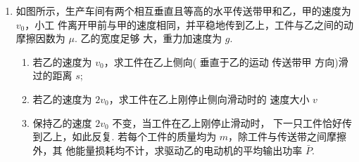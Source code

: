 \begin{enumerate}
\begin{enumerate}
\end{enumerate}
\begin{figure}[h!]
\flushright

\end{figure}




\newpage
\item 
{}
如图所示，生产车间有两个相互垂直且等高的水平传送带甲和乙，甲的速度为 $ v_{0} $，小工
件离开甲前与甲的速度相同，并平稳地传到乙上，工件与乙之间的动摩擦因数为 $ \mu $. 乙的宽度足够
大，重力加速度为 $ g $.
\begin{enumerate}
\renewcommand{\labelenumi}{\arabic{enumi}.}
\item
若乙的速度为 $ v_{0} $，求工件在乙上侧向( 垂直于乙的运动
传送带甲
方向)滑过的距离 $ s $;


\item 
若乙的速度为 $ 2 v_{0} $，求工件在乙上刚停止侧向滑动时的
速度大小 $ v $



\item 
保持乙的速度 $ 2 v_{0} $ 不变，当工件在乙上刚停止滑动时，
下一只工件恰好传到乙上，如此反复. 若每个工件的质量均为 $ m $，除工件与传送带之间摩擦外，其
他能量损耗均不计，求驱动乙的电动机的平均输出功率 $ \bar{P} $.




\end{enumerate}
\begin{figure}[h!]
\flushright

\end{figure}



\end{enumerate}
